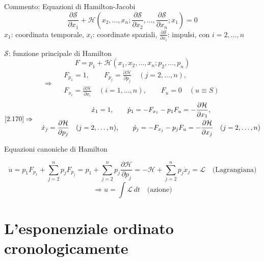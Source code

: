 \documentclass[a4paper,11pt]{report}
\begin{document}
Commento: Equazioni di Hamilton-Jacobi
\[
\frac{\partial \mathcal{S}}{\partial x_1}+\mathcal{H} \left(x_2,\dots,x_n; \frac{\partial \mathcal{S}}{\partial x_2}, \dots,\frac{\partial \mathcal{S}}{\partial x_n}; x_1 \right)=0
\]
$x_1$: coordinata temporale, $x_i$: coordinate spaziali, $\frac{\partial \mathcal{S}}{\partial x_i}$: impulsi, con $i=2,\ldots,n$

$\mathcal{S}$: funzione principale di Hamilton
\[
F= p_1 + \mathcal{H}(x_1,x_2,\dots,x_n;p_2,\dots,p_n)
\]
\[
\Rightarrow \quad
\begin{gathered}
F_{p_1}=1,\qquad F_{p_j}=\frac{\partial \mathcal{H}}{\partial p_j} \quad (j=2,\dots,n),\\
F_{x_i}=\frac{\partial \mathcal{H}}{\partial x_i} \quad (i=1,\dots,n), \qquad F_u=0 \quad (u\equiv S)
\end{gathered}
\]
\[
\eqref{2.170} \Rightarrow \quad
\begin{gathered}
\dot{x}_1=1,\qquad \dot{p}_1=-F_{x_1}-p_1F_u = -\frac{\partial \mathcal{H}}{\partial x_1}, \\
 \dot{x}_j=\frac{\partial \mathcal{H}}{\partial p_j} \quad (j=2,\dots,n), \qquad \dot{p}_j=-F_{x_j}-p_jF_u=-\frac{\partial \mathcal{H}}{\partial x_j} \quad ( j=2,\dots,n)
\end{gathered}
\]
\centerline{Equazioni canoniche di Hamilton}
\[
\dot{u}=p_1 F_{p_1} + \sum_{j=2}^n p_j F_{p_j} = p_1+ \sum_{j=2}^n p_j \frac{\partial \mathcal{H}}{\partial p_j}=-\mathcal{H}+\sum_{j=2}^n p_j \dot{x}_j=\mathcal{L} \quad \text{(Lagrangiana)}
\]
\[
\Rightarrow u=\int \mathcal{L}\, dt \quad \text{(azione)}
\]

\section{L'esponenziale ordinato cronologicamente}
\end{document}
